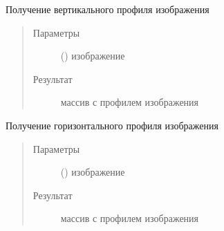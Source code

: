 \documentclass[letterpaper,10pt,russian]{sphinxmanual}
\begin{document}
\begin{fulllineitems}
\label{\detokenize{TextProfiler:TextProfiler.get_y_profile}}
Получение вертикального профиля изображения
\begin{quote}\begin{description}
\item[{Параметры}] \leavevmode
{} () \textendash{} изображение

\item[{Результат}] \leavevmode
{} \textendash{} массив с профилем изображения

\end{description}\end{quote}

\end{fulllineitems}


\begin{fulllineitems}
\label{\detokenize{TextProfiler:TextProfiler.get_x_profile}}
Получение горизонтального профиля изображения
\begin{quote}\begin{description}
\item[{Параметры}] \leavevmode
{} () \textendash{} изображение

\item[{Результат}] \leavevmode
{} \textendash{} массив с профилем изображения

\end{description}\end{quote}

\end{fulllineitems}

\end{document}
